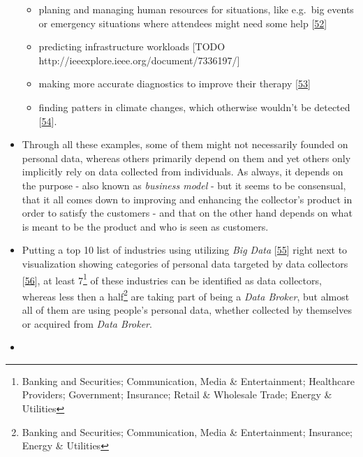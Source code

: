 \documentclass[12pt,english,a4paper,titlepage,cleardoublepage=empty,dottedtoc]{report}
\providecommand{\tightlist}{%
  \setlength{\itemsep}{0pt}\setlength{\parskip}{0pt}}
\begin{document}
\begin{itemize}
  \begin{itemize}
  \tightlist
  \item
    planing and managing human resources for situations, like e.g.~big
    events or emergency situations where attendees might need some help
    {[}\protect\hyperlink{ref-estimating-the-locations-of-emergency-events-from-twitter-streams_2014}{52}{]}
  \item
    predicting infrastructure workloads {[}TODO
    http://ieeexplore.ieee.org/document/7336197/{]}
  \item
    making more accurate diagnostics to improve their therapy
    {[}\protect\hyperlink{ref-the-practice-of-predictive-analytics-in-healthcare_2013}{53}{]}
  \item
    finding patters in climate changes, which otherwise wouldn't be
    detected
    {[}\protect\hyperlink{ref-data-collection-for-climate-changes_2014}{54}{]}.
  \end{itemize}
\item
  Through all these examples, some of them might not necessarily founded
  on personal data, whereas others primarily depend on them and yet
  others only implicitly rely on data collected from individuals. As
  always, it depends on the purpose - also known as \emph{business
  model} - but it seems to be consensual, that it all comes down to
  improving and enhancing the collector's product in order to satisfy
  the customers - and that on the other hand depends on what is meant to
  be the product and who is seen as customers.
\item
  Putting a top 10 list of industries using utilizing \emph{Big Data}
  {[}\protect\hyperlink{ref-graphic_2015_applications-of-big-data-in-10-industry-verticals}{55}{]}
  right next to visualization showing categories of personal data
  targeted by data collectors\\
  {[}\protect\hyperlink{ref-graphic_2012_personal-data-ecosystem}{56}{]},
  at least 7\footnote{Banking and Securities; Communication, Media \&
    Entertainment; Healthcare Providers; Government; Insurance; Retail
    \& Wholesale Trade; Energy \& Utilities} of these industries can be
  identified as data collectors, whereas less then a half\footnote{Banking
    and Securities; Communication, Media \& Entertainment; Insurance;
    Energy \& Utilities} are taking part of being a \emph{Data Broker},
  but almost all of them are using people's personal data, whether
  collected by themselves or acquired from \emph{Data Broker}.
\item

\end{itemize}
\end{document}
